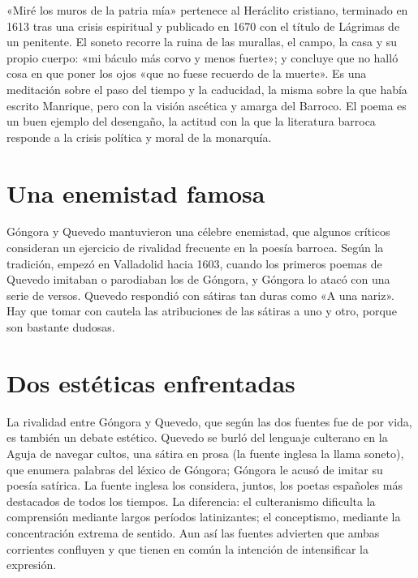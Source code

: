 \documentclass{book}
\begin{document}
«Miré los muros de la patria mía» pertenece al Heráclito cristiano, terminado en 1613 tras una crisis espiritual y publicado en 1670 con el título de Lágrimas de un penitente. El soneto recorre la ruina de las murallas, el campo, la casa y su propio cuerpo: «mi báculo más corvo y menos fuerte»; y concluye que no halló cosa en que poner los ojos «que no fuese recuerdo de la muerte». Es una meditación sobre el paso del tiempo y la caducidad, la misma sobre la que había escrito Manrique, pero con la visión ascética y amarga del Barroco. El poema es un buen ejemplo del desengaño, la actitud con la que la literatura barroca responde a la crisis política y moral de la monarquía.


\section{Una enemistad famosa}

Góngora y Quevedo mantuvieron una célebre enemistad, que algunos críticos consideran un ejercicio de rivalidad frecuente en la poesía barroca. Según la tradición, empezó en Valladolid hacia 1603, cuando los primeros poemas de Quevedo imitaban o parodiaban los de Góngora, y Góngora lo atacó con una serie de versos. Quevedo respondió con sátiras tan duras como «A una nariz». Hay que tomar con cautela las atribuciones de las sátiras a uno y otro, porque son bastante dudosas.


\section{Dos estéticas enfrentadas}

La rivalidad entre Góngora y Quevedo, que según las dos fuentes fue de por vida, es también un debate estético. Quevedo se burló del lenguaje culterano en la Aguja de navegar cultos, una sátira en prosa (la fuente inglesa la llama soneto), que enumera palabras del léxico de Góngora; Góngora le acusó de imitar su poesía satírica. La fuente inglesa los considera, juntos, los poetas españoles más destacados de todos los tiempos. La diferencia: el culteranismo dificulta la comprensión mediante largos períodos latinizantes; el conceptismo, mediante la concentración extrema de sentido. Aun así las fuentes advierten que ambas corrientes confluyen y que tienen en común la intención de intensificar la expresión.
\end{document}
